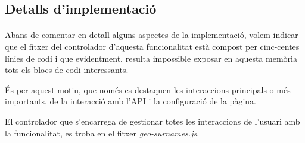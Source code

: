 \subsection{Detalls d'implementació}

    \paragraph{}
    Abans de comentar en detall alguns aspectes de la implementació, volem indicar que el fitxer del controlador d'aquesta funcionalitat està compost per cinc-centes línies de codi i que evidentment, resulta impossible exposar en aquesta memòria tots els blocs de codi interessants.

    És per aquest motiu, que només es destaquen les interaccions principals o més importants, de la interacció amb l'API i la configuració de la pàgina.

    El controlador que s'encarrega de gestionar totes les interaccions de l'usuari amb la funcionalitat, es troba en el fitxer \emph{geo-surnames.js}.

    
    
    
    
